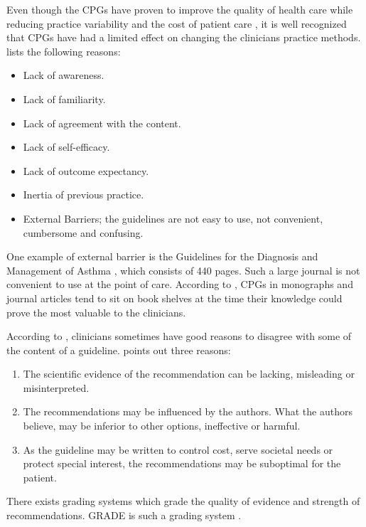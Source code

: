 Even though the CPGs have proven to improve the quality of health care while reducing practice variability and the cost of patient care \parencite{DeClercq2008}, it is well recognized that CPGs have had a limited effect on changing the clinicians practice methods. \textcite{Cabana1999} lists the following reasons:
\begin{itemize}
	\item Lack of awareness.
	\item Lack of familiarity.
	\item Lack of agreement with the content.
	\item Lack of self-efficacy.
	\item Lack of outcome expectancy.
	\item Inertia of previous practice. 
	\item External Barriers; the guidelines are not easy to use, not convenient, cumbersome and confusing.
\end{itemize}One example of external barrier is the Guidelines for the Diagnosis and Management of Asthma \parencite{NationalHeartLungandBloodInstitute2007}, which consists of 440 pages. Such a large journal is not convenient to use at the point of care. According to \textcite{Shortliffe1998}, CPGs in monographs and journal articles tend to sit on book shelves at the time their knowledge could prove the most valuable to the clinicians. 

According to \textcite{Woolf1999}, clinicians sometimes have good reasons to disagree with some of the content of a guideline. \textcite{Woolf1999} points out three reasons:
\begin{enumerate}
	\item The scientific evidence of the recommendation can be lacking, misleading or misinterpreted.
	\item The recommendations may be influenced by the authors. What the authors believe, may be inferior to other options, ineffective or harmful.
	\item As the guideline may be written to control cost, serve societal needs or protect special interest, the recommendations may be suboptimal for the patient.
\end{enumerate}
There exists grading systems which grade the quality of evidence and strength of recommendations. GRADE is such a grading system \parencite{Guyatt2008}.


